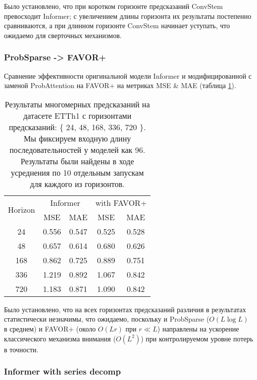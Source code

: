 Было установлено, что при коротком горизонте предсказаний 
ConvStem превосходит Informer; с увеличением длины горизонта 
их результаты постепенно сравниваются, а при длинном горизонте 
ConvStem начинает уступать, что ожидаемо для сверточных механизмов.

\subsubsection{ProbSparse -> FAVOR+}

Сравнение эффективности оригинальной модели Informer и модифицированной
с заменой ProbAttention на FAVOR+ 
на метриках MSE \& MAE (таблица \ref{tab:etth1-favor}).

\begin{table}[!ht]
    \centering
    \begin{tabular}{c  cc  cc}
    \toprule
    \multirow{2}{*}{{Horizon}} 
      & \multicolumn{2}{c}{{Informer}} 
      & \multicolumn{2}{c}{with FAVOR+} \\
    \cmidrule(lr){2-3} \cmidrule(lr){4-5}
      & {MSE} & {MAE} 
      & {MSE} & {MAE} \\
    \midrule
    24   & 0.556 & 0.547 & 0.525 & 0.528 \\
    48   & 0.657 & 0.614 & 0.680 & 0.626 \\
    168  & 0.862 & 0.725 & 0.889 & 0.751 \\
    336  & 1.219 & 0.892 & 1.067 & 0.842 \\
    720  & 1.183 & 0.871 & 1.090 & 0.842 \\
    \bottomrule
    \end{tabular}
    \caption{Результаты многомерных предсказаний на датасете ETTh1 с 
    горизонтами предсказаний: \{ 24, 48, 168, 336, 720 \}. 
    Мы фиксируем входную длину последовательностей у моделей как 96.
    Результаты были найдены в ходе усреднения по 10 отдельным запускам 
    для каждого из горизонтов.}
    \label{tab:etth1-favor}
\end{table}

Было установлено, что на всех горизонтах предсказаний различия в результатах 
статистически незначимы, что ожидаемо, поскольку и ProbSparse ($O(L \log L)$ в среднем) 
и FAVOR+ (около $O(Lr)$ при $r \ll L$) направлены на ускорение классического механизма 
внимания ($O(L^2)$) при контролируемом уровне потерь в точности.

\subsubsection{Informer with series decomp}

